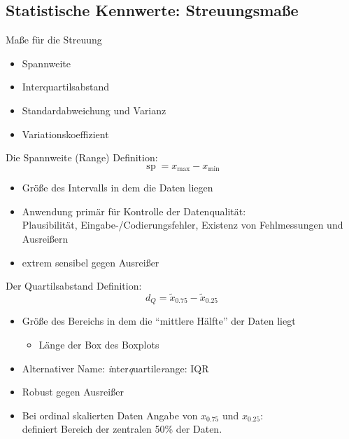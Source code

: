 \documentclass[
  10pt,
  ignorenonframetext,
]{beamer}
\providecommand{\tightlist}{%
  \setlength{\itemsep}{0pt}\setlength{\parskip}{0pt}}
\begin{document}
\subsection{Statistische Kennwerte:
Streuungsmaße}\label{statistische-kennwerte-streuungsmauxdfe}

\begin{frame}{Maße für die Streuung}
\label{mauxdfe-fuxfcr-die-streuung}
\begin{itemize}
\tightlist
\item
  Spannweite
\item
  Interquartilsabstand
\item
  Standardabweichung und Varianz
\item
  Variationskoeffizient
\end{itemize}
\end{frame}

\begin{frame}{Die Spannweite (Range)}
\label{die-spannweite-range}
Definition: \begin{equation*}
  \operatorname{sp} = x_{\max} - x_{\min}
\end{equation*}

\begin{itemize}
\tightlist
\item
  Größe des Intervalls in dem die Daten liegen
\item
  Anwendung primär für Kontrolle der Datenqualität:\\
  Plausibilität, Eingabe-/Codierungsfehler, Existenz von Fehlmessungen
  und Ausreißern
\item
  extrem sensibel gegen Ausreißer
\end{itemize}
\end{frame}

\begin{frame}{Der Quartilsabstand}
\label{der-quartilsabstand}
Definition: \begin{equation*}
      d_Q = \tilde x_{0.75} - \tilde x_{0.25}
\end{equation*}

\begin{itemize}
\item
  Größe des Bereichs in dem die ``mittlere Hälfte'' der Daten liegt

  \begin{itemize}
  \tightlist
  \item
    Länge der Box des Boxplots
  \end{itemize}
\item
  Alternativer Name: \emph{i}nter\emph{q}uartile\emph{r}ange: IQR
\item
  Robust gegen Ausreißer
\item
  Bei ordinal skalierten Daten Angabe von \(x_{0.75}\) und
  \(x_{0.25}\):\\
  definiert Bereich der zentralen 50\% der Daten.
\end{itemize}
\end{frame}
\end{document}

